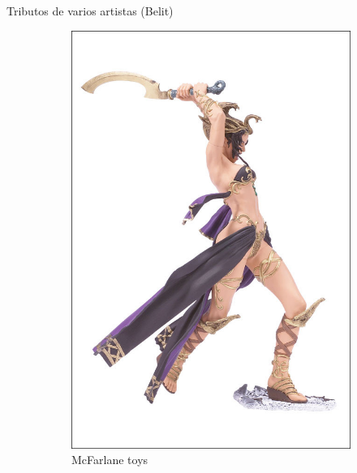\begin{frame}{Tributos de varios artistas (Belit)}
	\begin{figure}[htp]
		\centering
		\begin{subfigure}[b]{0.22\textwidth}
			\includegraphics[width=\textwidth]{img/tributos/BelitFigure}
			\caption{McFarlane toys}
		\end{subfigure}
		~
		\begin{subfigure}[b]{0.22\textwidth}

\end{subfigure}
\end{figure}
\end{frame}
